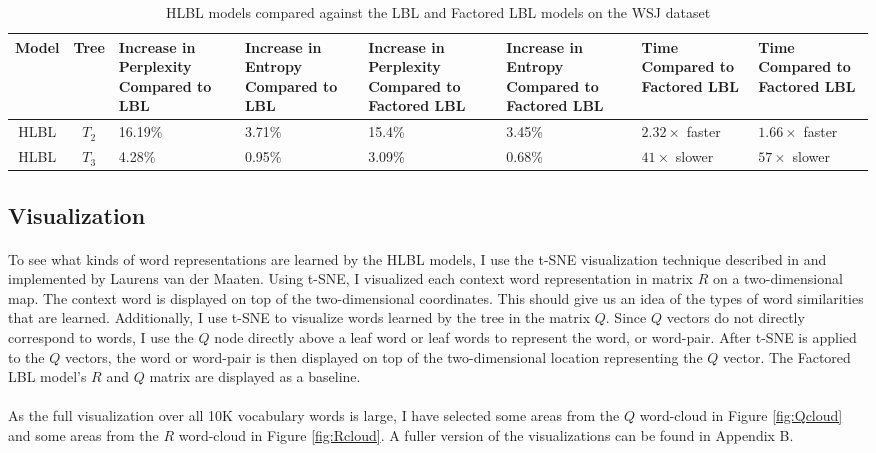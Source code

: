 \begin{table*} \centering
{}
\begin{tabular}{@{}ccC{1.75cm}C{1.75cm}C{1.75cm}C{1.75cm}C{1.75cm}C{1.75cm}@{}}\toprule
Model & Tree
& Increase in Perplexity Compared to LBL & Increase in Entropy Compared to LBL
& Increase in Perplexity Compared to Factored LBL & Increase in Entropy Compared to Factored LBL
& Time Compared to Factored LBL & Time Compared to Factored LBL
\\
\midrule
 HLBL & $T_2$ & 16.19\% & 3.71\% & 15.4\% & 3.45\% & $2.32\times$ faster & $1.66\times$ faster\\
 HLBL & $T_3$ & 4.28\% & 0.95\% & 3.09\% & 0.68\% &$41\times$ slower & $57\times$ slower\\
\bottomrule
\end{tabular}
\caption{HLBL models compared against the LBL and Factored LBL models on the WSJ dataset}
\label{tab:perplexityAndSpeedup}
\end{table*}


\subsection{Visualization} \label{sec:tsne}
\paragraph{}
To see what kinds of word representations are learned by the HLBL models, I use the t-SNE visualization technique described in \cite{Maaten2008} and implemented by Laurens van der Maaten. Using t-SNE, I visualized each context word representation in matrix $R$ on a two-dimensional map. The context word is displayed on top of the two-dimensional coordinates. This should give us an idea of the types of word similarities that are learned. Additionally, I use t-SNE to visualize words learned by the tree in the matrix $Q$. Since $Q$ vectors do not directly correspond to words, I use the $Q$ node directly above a leaf word or leaf words to represent the word, or word-pair. After t-SNE is applied to the $Q$ vectors, the word or word-pair is then displayed on top of the two-dimensional location representing the $Q$ vector. The Factored LBL model's $R$ and $Q$ matrix are displayed as a baseline.
\paragraph{}
As the full visualization over all 10K vocabulary words is large, I have selected some areas from the $Q$ word-cloud in Figure \ref{fig:Qcloud} and some areas from the $R$ word-cloud in Figure \ref{fig:Rcloud}. A fuller version of the visualizations can be found in Appendix B. 

